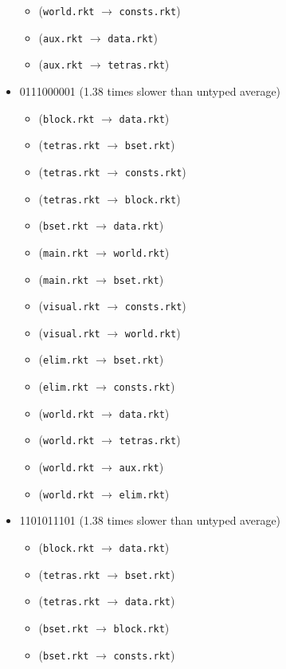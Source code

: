 \documentclass{article}
\newcommand{\mono}[1]{\texttt{#1}}
\begin{document}
\begin{itemize}
\begin{itemize}
  \item (\mono{world.rkt} $\rightarrow$ \mono{consts.rkt})
  \item (\mono{aux.rkt} $\rightarrow$ \mono{data.rkt})
  \item (\mono{aux.rkt} $\rightarrow$ \mono{tetras.rkt})
  \end{itemize}
\item 0111000001 (1.38 times slower than untyped average)
  \begin{itemize}
  \item (\mono{block.rkt} $\rightarrow$ \mono{data.rkt})
  \item (\mono{tetras.rkt} $\rightarrow$ \mono{bset.rkt})
  \item (\mono{tetras.rkt} $\rightarrow$ \mono{consts.rkt})
  \item (\mono{tetras.rkt} $\rightarrow$ \mono{block.rkt})
  \item (\mono{bset.rkt} $\rightarrow$ \mono{data.rkt})
  \item (\mono{main.rkt} $\rightarrow$ \mono{world.rkt})
  \item (\mono{main.rkt} $\rightarrow$ \mono{bset.rkt})
  \item (\mono{visual.rkt} $\rightarrow$ \mono{consts.rkt})
  \item (\mono{visual.rkt} $\rightarrow$ \mono{world.rkt})
  \item (\mono{elim.rkt} $\rightarrow$ \mono{bset.rkt})
  \item (\mono{elim.rkt} $\rightarrow$ \mono{consts.rkt})
  \item (\mono{world.rkt} $\rightarrow$ \mono{data.rkt})
  \item (\mono{world.rkt} $\rightarrow$ \mono{tetras.rkt})
  \item (\mono{world.rkt} $\rightarrow$ \mono{aux.rkt})
  \item (\mono{world.rkt} $\rightarrow$ \mono{elim.rkt})
  \end{itemize}
\item 1101011101 (1.38 times slower than untyped average)
  \begin{itemize}
  \item (\mono{block.rkt} $\rightarrow$ \mono{data.rkt})
  \item (\mono{tetras.rkt} $\rightarrow$ \mono{bset.rkt})
  \item (\mono{tetras.rkt} $\rightarrow$ \mono{data.rkt})
  \item (\mono{bset.rkt} $\rightarrow$ \mono{block.rkt})
  \item (\mono{bset.rkt} $\rightarrow$ \mono{consts.rkt})

\end{itemize}
\end{itemize}
\end{document}

